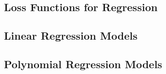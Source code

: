 

\subsection{Loss Functions for Regression}


\subsection{Linear Regression Models}


\subsection{Polynomial Regression Models}
